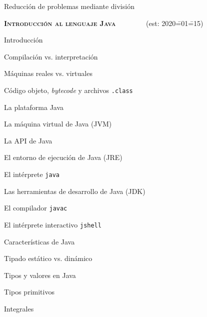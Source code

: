 \begin{longenum}
\begin{longenum}
\begin{longenum}
            \item Reducción de problemas mediante división
        \end{longenum}
    \end{longenum}
    \item \textbf{\textsc{Introducción al lenguaje Java}} \ \ \ \ \ \ \ \ (est: 2020\==01\==15)
    \begin{longenum}
        \item Introducción
        \item Compilación vs. interpretación
        \begin{longenum}
            \item Máquinas reales vs. virtuales
            \item Código objeto, \textit{bytecode} y archivos \texttt{.class}
            \item La plataforma Java
            \begin{longenum}
                \item La máquina virtual de Java (JVM)
                \item La API de Java
            \end{longenum}
            \item El entorno de ejecución de Java (JRE)
            \begin{longenum}
                \item El intérprete \texttt{java}
            \end{longenum}
            \item Las herramientas de desarrollo de Java (JDK)
            \begin{longenum}
                \item El compilador \texttt{javac}
                \item El intérprete interactivo \texttt{jshell}
            \end{longenum}
        \end{longenum}
        \item Características de Java
        \item Tipado estático vs. dinámico
        \item Tipos y valores en Java
        \begin{longenum}
            \item Tipos  primitivos
            \begin{longenum}
                \item Integrales

\end{longenum}
\end{longenum}
\end{longenum}
\end{longenum}
